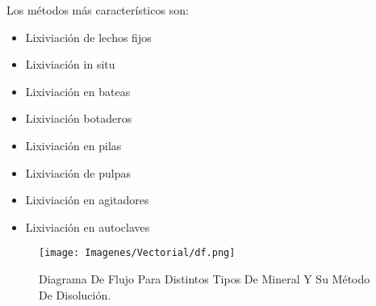 Los m\'etodos m\'as caracter\'isticos son:
\begin{itemize}
 \item Lixiviaci\'on de lechos fijos
 \item Lixiviaci\'on in situ
 \item Lixiviaci\'on en bateas
 \item Lixiviaci\'on botaderos
 \item Lixiviaci\'on en pilas
 \item Lixiviaci\'on de pulpas
 \item Lixiviaci\'on en agitadores
 \item Lixiviaci\'on en autoclaves
\end{itemize}

\begin{figure}[H]
 \centering
 \texttt{[image: Imagenes/Vectorial/df.png]}
 \caption{Diagrama De Flujo Para Distintos Tipos De Mineral Y Su M\'etodo De Disoluci\'on.}
 \label{fig:ghh}
\end{figure}

